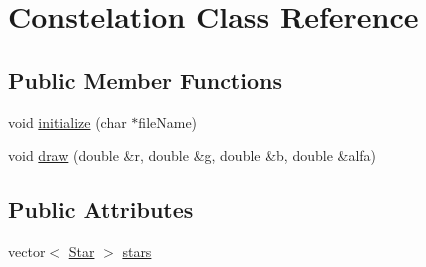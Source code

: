 \hypertarget{classConstelation}{\section{Constelation Class Reference}
\label{classConstelation}
}
\subsection*{Public Member Functions}
\begin{DoxyCompactItemize}
\item 
void \hyperlink{classConstelation_a67e8f8db581831ce96b9002250547784}{initialize} (char $\ast$file\-Name)
\item 
void \hyperlink{classConstelation_a5faf3599ffc10eb1855b7721ac9e00c0}{draw} (double \&r, double \&g, double \&b, double \&alfa)
\end{DoxyCompactItemize}
\subsection*{Public Attributes}
\begin{DoxyCompactItemize}
\item 
vector$<$ \hyperlink{classStar}{Star} $>$ \hyperlink{classConstelation_a71d208ee2a6b57c32f28044ee7acad55}{stars}
\end{DoxyCompactItemize}


